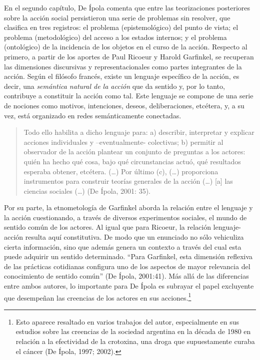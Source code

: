 En el segundo capítulo, De Ípola comenta que entre las teorizaciones posteriores sobre la acción social persistieron una serie de problemas sin resolver, que clasifica en tres registros: el problema (epistemológico) del punto de vista; el problema (metodológico) del acceso a los estados internos; y el problema (ontológico) de la incidencia de los objetos en el curso de la acción. Respecto al primero, a partir de los aportes de Paul Ricoeur y Harold Garfinkel, se recuperan las dimensiones discursivas y representacionales como partes integrantes de la acción. Según el filósofo francés, existe un lenguaje específico de la acción, es decir, una \emph{semántica natural de la acción} que da sentido y, por lo tanto, contribuye a constituir la acción como tal. Este lenguaje se compone de una serie de nociones como motivos, intenciones, deseos, deliberaciones, etcétera, y, a su vez, está organizado en redes semánticamente conectadas.

\begin{quote}
Todo ello habilita a dicho lenguaje para: a) describir, interpretar y explicar acciones individuales y --eventualmente- colectivas; b) permitir al observador de la acción plantear un conjunto de preguntas a los actores: quién ha hecho qué cosa, bajo qué circunstancias actuó, qué resultados esperaba obtener, etcétera. (\ldots) Por último (c), (\ldots) proporciona instrumentos para construir teorías generales de la acción (\ldots) {[}a{]} las ciencias sociales (\ldots) (De Ípola, 2001: 35).
\end{quote}

Por su parte, la etnometología de Garfinkel aborda la relación entre el lenguaje y la acción cuestionando, a través de diversos experimentos sociales, el mundo de sentido común de los actores. Al igual que para Ricoeur, la relación lenguaje-acción resulta aquí constitutiva. De modo que un enunciado no sólo vehiculiza cierta información, sino que además genera un contexto a través del cual esta puede adquirir un sentido determinado. ``Para Garfinkel, esta dimensión reflexiva de las prácticas cotidianas configura uno de los aspectos de mayor relevancia del conocimiento de sentido común'' (De Ípola, 2001:41). Más allá de las diferencias entre ambos autores, lo importante para De Ípola es subrayar el papel excluyente que desempeñan las creencias de los actores en sus acciones.\footnote{Esto aparece resaltado en varios trabajos del autor, especialmente en sus estudios sobre las creencias de la sociedad argentina en la década de 1980 en relación a la efectividad de la crotoxina, una droga que supuestamente curaba el cáncer (De Ípola, 1997; 2002).}

